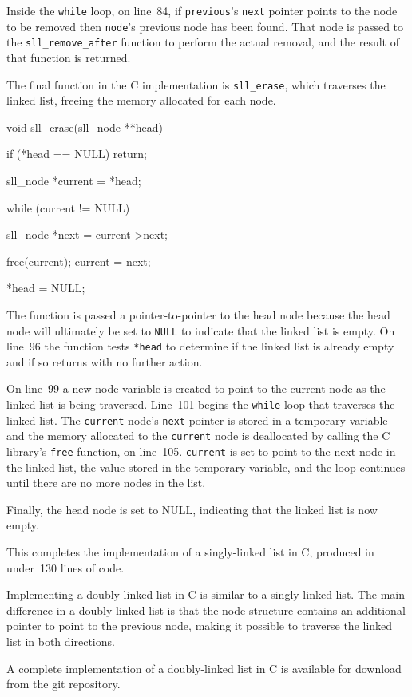 \documentclass{article}
\begin{document}
  Inside the \verb|while| loop, on line~84, if \verb|previous|'s \verb|next| pointer points to the node to be removed then \verb|node|'s previous node has been found. That node is passed to the \verb|sll_remove_after| function to perform the actual removal, and the result of that function is returned.

  The final function in the C implementation is \verb|sll_erase|, which traverses the linked list, freeing the memory allocated for each node.
  \begin{lstc}
void sll_erase(sll_node **head)
{
  if (*head == NULL)
    return;

  sll_node *current = *head;

  while (current != NULL)
  {
    sll_node *next = current->next;

    free(current);
    current = next;
  }

  *head = NULL;
}\end{lstc}
  The function is passed a pointer-to-pointer to the head node because the head node will ultimately be set to \verb|NULL| to indicate that the linked list is empty. On line~96 the function tests \verb|*head| to determine if the linked list is already empty and if so returns with no further action.

  On line~99 a new node variable is created to point to the current node as the linked list is being traversed. Line~101 begins the \verb|while| loop that traverses the linked list. The \verb|current| node's \verb|next| pointer is stored in a temporary variable and the memory allocated to the \verb|current| node is deallocated by calling the C library's \verb|free| function, on line~105. \verb|current| is set to point to the next node in the linked list, the value stored in the temporary variable, and the loop continues until there are no more nodes in the list.

  Finally, the head node is set to NULL, indicating that the linked list is now empty.

  This completes the implementation of a singly-linked list in C, produced in under~130 lines of code.

  Implementing a doubly-linked list in C is similar to a singly-linked list. The main difference in a doubly-linked list is that the node structure contains an additional pointer to point to the previous node, making it possible to traverse the linked list in both directions.

  A complete implementation of a doubly-linked list in C is available for download from the git repository.
\end{document}
